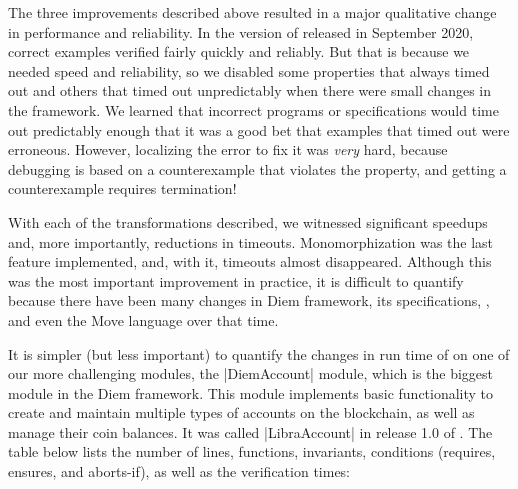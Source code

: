 

The three improvements described above resulted in a major qualitative
change in performance and reliability. In the version of \MVP released
in September 2020, correct examples verified fairly quickly and
reliably.  But that is because we needed speed and reliability, so we
disabled some properties that always timed out and others that timed
out unpredictably when there were small changes in the framework.  We
learned that incorrect programs or specifications would time out
predictably enough that it was a good bet that examples that timed out
were erroneous.  However, localizing the error to fix it was
\emph{very} hard, because debugging is based on a counterexample that
violates the property, and getting a counterexample requires
termination!

With each of the transformations described, we witnessed significant speedups
and, more importantly, reductions in timeouts.  Monomorphization was the last
feature implemented, and, with it, timeouts almost disappeared. Although this
was the most important improvement in practice, it is difficult to quantify
because there have been many changes in Diem framework, its specifications,
\MVP, and even the Move language over that time.


It is simpler (but less important) to quantify the changes in run time of \MVP
on one of our more challenging modules,
the |DiemAccount| module, which is the biggest module in the
Diem framework. This module implements basic functionality to create and
maintain multiple types of accounts on the blockchain, as well as manage their
coin balances. It was called |LibraAccount| in release 1.0 of \MVP. The table
below lists the number of lines, functions, invariants, conditions (requires, ensures,
and aborts-if), as well as the verification times:

